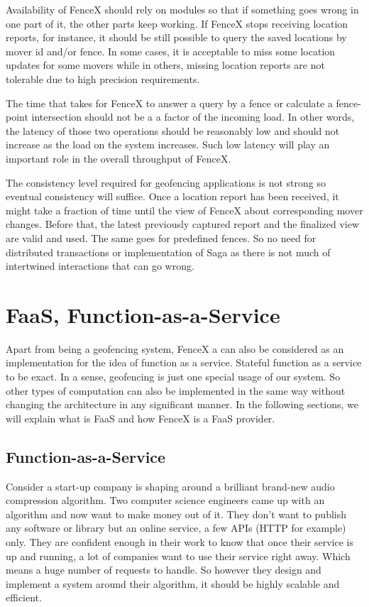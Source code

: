 \documentclass[a4]{report}
\begin{document}
    Availability of FenceX should rely on modules so that if something goes wrong in one part of it, the other parts
    keep working.
    If FenceX stops receiving location reports, for instance, it should be still possible to query the saved
    locations by mover id and/or fence.
    In some cases, it is acceptable to miss some location updates for some movers while in others, missing location
    reports are not tolerable due to high precision requirements.

    The time that takes for FenceX to answer a query by a fence or calculate a fence-point intersection should not be a
    a factor of the incoming load.
    In other words, the latency of those two operations should be reasonably low and should not increase as the load
    on the system increases.
    Such low latency will play an important role in the overall throughput of FenceX.

    The consistency level required for geofencing applications is not strong so eventual consistency will suffice.
    Once a location report has been received, it might take a fraction of time until the view of FenceX about corresponding mover changes.
    Before that, the latest previously captured report and the finalized view are valid and used.
    The same goes for predefined fences.
    So no need for distributed transactions or implementation of Saga as there is not much of intertwined
    interactions that can go wrong.


    \chapter{FaaS, Function-as-a-Service}
    Apart from being a geofencing system, FenceX a can also be considered as an implementation for the idea of function as
    a service\cite{whatisfaas}.
    Stateful function as a service to be exact.
    In a sense, geofencing is just one special usage of our system.
    So other types of computation can also be implemented in the same way without changing the architecture in any significant manner.
    In the following sections, we will explain what is FaaS and how FenceX is a FaaS provider.


    \section{Function-as-a-Service}
    Consider a start-up company is shaping around a brilliant brand-new audio compression algorithm.
    Two computer science engineers came up with an algorithm and now want to make money out of it.
    They don't want to publish any software or library but an online service, a few APIs (HTTP for example) only.
    They are confident enough in their work to know that once their service is up and running, a lot of companies want to use their service right away.
    Which means a huge number of requests to handle.
    So however they design and implement a system around their algorithm, it should be highly scalable and efficient.
\end{document}

